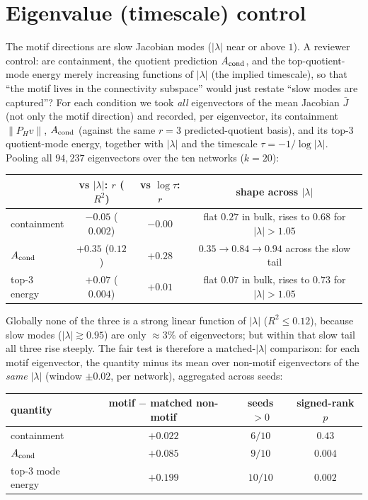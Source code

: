 \documentclass[11pt]{article}
\begin{document}
\section{Eigenvalue (timescale) control}
\label{sec:lambda}
The motif directions are slow Jacobian modes ($\lvert\lambda\rvert$ near or above $1$). A reviewer
control: are containment, the quotient prediction $A_{\rm cond}$, and the top-quotient-mode energy
merely increasing functions of $\lvert\lambda\rvert$ (the implied timescale), so that ``the motif
lives in the connectivity subspace'' would just restate ``slow modes are captured''? For each
condition we took \emph{all} eigenvectors of the mean Jacobian $\bar J$ (not only the motif
direction) and recorded, per eigenvector, its containment $\lVert P_H v\rVert$, $A_{\rm cond}$
(against the same $r=3$ predicted-quotient basis), and its top-3 quotient-mode energy, together with
$\lvert\lambda\rvert$ and the timescale $\tau=-1/\log\lvert\lambda\rvert$. Pooling all $94{,}237$
eigenvectors over the ten networks ($k=20$):
\begin{center}\small
\begin{tabular}{lccc}
\toprule
 & vs $\lvert\lambda\rvert$: $r$ ($R^2$) & vs $\log\tau$: $r$ & shape across $\lvert\lambda\rvert$ \\
\midrule
containment      & $-0.05$ ($0.002$) & $-0.00$ & flat $0.27$ in bulk, rises to $0.68$ for $\lvert\lambda\rvert>1.05$ \\
$A_{\rm cond}$   & $+0.35$ ($0.12$)  & $+0.28$ & $0.35\to0.84\to0.94$ across the slow tail \\
top-3 energy     & $+0.07$ ($0.004$) & $+0.01$ & flat $0.07$ in bulk, rises to $0.73$ for $\lvert\lambda\rvert>1.05$ \\
\bottomrule
\end{tabular}
\end{center}
Globally none of the three is a strong linear function of $\lvert\lambda\rvert$ ($R^2\leq0.12$),
because slow modes ($\lvert\lambda\rvert\gtrsim0.95$) are only $\approx3\%$ of eigenvectors; but
within that slow tail all three rise steeply. The fair test is therefore a matched-$\lvert\lambda\rvert$
comparison: for each motif eigenvector, the quantity minus its mean over non-motif eigenvectors of
the \emph{same} $\lvert\lambda\rvert$ (window $\pm0.02$, per network), aggregated across seeds:
\begin{center}\small
\begin{tabular}{lccc}
\toprule
quantity & motif $-$ matched non-motif & seeds $>0$ & signed-rank $p$ \\
\midrule
containment      & $+0.022$ & $6/10$  & $0.43$ \\
$A_{\rm cond}$   & $+0.085$ & $9/10$  & $0.004$ \\
top-3 mode energy & $+0.199$ & $10/10$ & $0.002$ \\
\bottomrule
\end{tabular}
\end{center}
\end{document}
